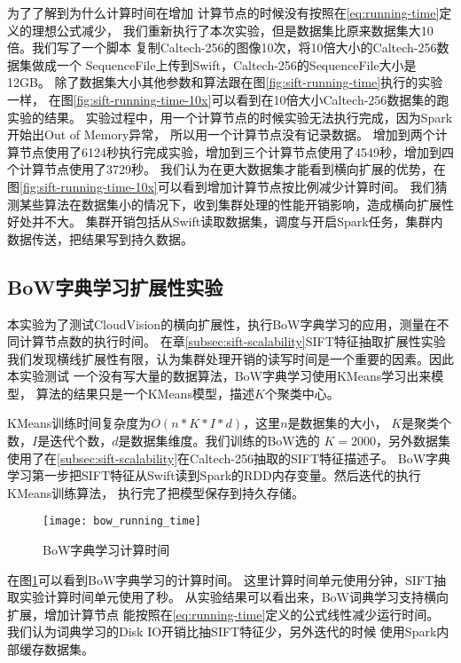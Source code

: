 为了了解到为什么计算时间在增加
计算节点的时候没有按照在\ref{eq:running-time}定义的理想公式减少，
我们重新执行了本次实验，但是数据集比原来数据集大10倍。我们写了一个脚本
复制Caltech-256的图像10次，将10倍大小的Caltech-256数据集做成一个
SequenceFile上传到Swift，Caltech-256的SequenceFile大小是12GB。
除了数据集大小其他参数和算法跟在图\ref{fig:sift-running-time}执行的实验一样，
在图\ref{fig:sift-running-time-10x}可以看到在10倍大小Caltech-256数据集的跑实验的结果。
实验过程中，用一个计算节点的时候实验无法执行完成，因为Spark开始出Out of Memory异常，
所以用一个计算节点没有记录数据。
增加到两个计算节点使用了6124秒执行完成实验，增加到三个计算节点使用了4549秒，增加到四个计算节点使用了3729秒。
我们认为在更大数据集才能看到横向扩展的优势，在图\ref{fig:sift-running-time-10x}可以看到增加计算节点按比例减少计算时间。
我们猜测某些算法在数据集小的情况下，收到集群处理的性能开销影响，造成横向扩展性好处并不大。
集群开销包括从Swift读取数据集，调度与开启Spark任务，集群内数据传送，把结果写到持久数据。




\subsection{BoW字典学习扩展性实验}
\label{subsec:bow-learning-scalability}
本实验为了测试CloudVision的横向扩展性，执行BoW字典学习的应用，测量在不同计算节点数的执行时间。
在章\ref{subsec:sift-scalability}SIFT特征抽取扩展性实验
我们发现横线扩展性有限，认为集群处理开销的读写时间是一个重要的因素。因此本实验测试
一个没有写大量的数据算法，BoW字典学习使用KMeans学习出来模型，
算法的结果只是一个KMeans模型，描述$K$个聚类中心。

KMeans训练时间复杂度为$O(n * K * I *d)$，这里$n$是数据集的大小，
$K$是聚类个数，$I$是迭代个数，$d$是数据集维度。我们训练的BoW选的
$K = 2000$，另外数据集使用了在\ref{subsec:sift-scalability}在Caltech-256抽取的SIFT特征描述子。
BoW字典学习第一步把SIFT特征从Swift读到Spark的RDD内存变量。然后迭代的执行KMeans训练算法，
执行完了把模型保存到持久存储。

\begin{figure}[h]
  \centering
    \texttt{[image: bow\_running\_time]}
  \caption{BoW字典学习计算时间}
  \label{fig:bow-running-time}
\end{figure}

在图\ref{fig:bow-running-time}可以看到BoW字典学习的计算时间。
这里计算时间单元使用分钟，SIFT抽取实验计算时间单元使用了秒。
从实验结果可以看出来，BoW词典学习支持横向扩展，增加计算节点
能按照在\ref{eq:running-time}定义的公式线性减少运行时间。
我们认为词典学习的Disk IO开销比抽SIFT特征少，另外迭代的时候
使用Spark内部缓存数据集。

